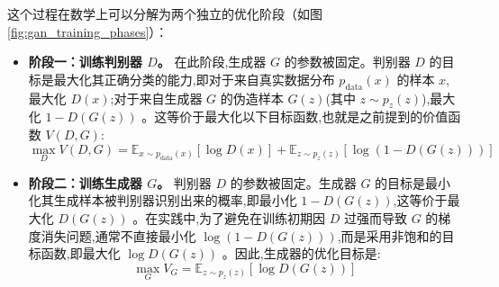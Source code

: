 \begin{itemize}
    这个过程在数学上可以分解为两个独立的优化阶段（如图 \ref{fig:gan_training_phases}）：
    \begin{itemize}
        \item \textbf{阶段一：训练判别器 $D$。} 在此阶段,生成器 $G$ 的参数被固定。判别器 $D$ 的目标是最大化其正确分类的能力,即对于来自真实数据分布 $p_{\text{data}}(x)$ 的样本 $x$,最大化 $D(x)$;对于来自生成器 $G$ 的伪造样本 $G(z)$(其中 $z \sim p_z(z)$),最大化 $1 - D(G(z))$ \cite{15}。这等价于最大化以下目标函数,也就是之前提到的价值函数 $V(D,G)$:
        $$ \max_{D} V(D, G) = \mathbb{E}_{x \sim p_{\text{data}}(x)}[\log D(x)] + \mathbb{E}_{z \sim p_{z}(z)}[\log(1 - D(G(z)))] $$
        
        \item \textbf{阶段二：训练生成器 $G$。} 判别器 $D$ 的参数被固定。生成器 $G$ 的目标是最小化其生成样本被判别器识别出来的概率,即最小化 $1 - D(G(z))$,这等价于最大化 $D(G(z))$ \cite{15}。在实践中,为了避免在训练初期因 $D$ 过强而导致 $G$ 的梯度消失问题,通常不直接最小化 $\log(1 - D(G(z)))$,而是采用非饱和的目标函数,即最大化 $\log D(G(z))$ \cite{15}。因此,生成器的优化目标是:
        $$ \max_{G} V_G = \mathbb{E}_{z \sim p_{z}(z)}[\log D(G(z))] $$
    \end{itemize}
    

\end{itemize}
